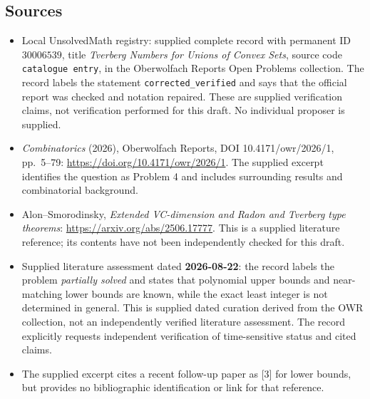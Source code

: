 \documentclass[11pt]{article}
\begin{document}
\subsection{Sources}
\begin{itemize}
\item Local UnsolvedMath registry: supplied complete record with permanent ID \(30006539\), title \emph{Tverberg Numbers for Unions of Convex Sets}, source code \texttt{catalogue entry}, in the Oberwolfach Reports Open Problems collection. The record labels the statement \texttt{corrected\_verified} and says that the official report was checked and notation repaired. These are supplied verification claims, not verification performed for this draft. No individual proposer is supplied.
\item \emph{Combinatorics} (2026), Oberwolfach Reports, DOI 10.4171/owr/2026/1, pp.\ 5--79: \url{https://doi.org/10.4171/owr/2026/1}. The supplied excerpt identifies the question as Problem 4 and includes surrounding results and combinatorial background.
\item Alon--Smorodinsky, \emph{Extended VC-dimension and Radon and Tverberg type theorems}: \url{https://arxiv.org/abs/2506.17777}. This is a supplied literature reference; its contents have not been independently checked for this draft.
\item Supplied literature assessment dated \textbf{2026-08-22}: the record labels the problem \emph{partially solved} and states that polynomial upper bounds and near-matching lower bounds are known, while the exact least integer is not determined in general. This is supplied dated curation derived from the OWR collection, not an independently verified literature assessment. The record explicitly requests independent verification of time-sensitive status and cited claims.
\item The supplied excerpt cites a recent follow-up paper as [3] for lower bounds, but provides no bibliographic identification or link for that reference.
\end{itemize}
\end{document}
